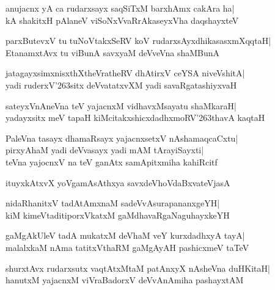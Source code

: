 \documentclass[twoside,12pt,openright]{book}
\def\S{\char'263}
\newcounter{shloka}[chapter]
\begin{document}
\begin{shloka}%
anujacnx yA ca rudarxsayx saqSiTxM barxhAmx cakAra ha|\\
kA shakitxH pAlaneV viSoNxVvaRrAkaseyxVha daqshayxteV
\end{shloka}

\begin{shloka}%
parxButevxV tu tuNoVtakxSeRV koV rudarxsAyxdhikasasxmXqqtaH|\\
EtanamxtAvx tu viBunA savxyaM deVveVna shaMBunA
\end{shloka}

\begin{shloka}%
jatagayxsimxnisxthXtheVratheRV dhAtirxV ceYSA niveVshitA|\\
yadi ruderxV\S sitx deVvatatxvXM yadi savaRgatashiyxvaH
\end{shloka}

\begin{shloka}%
sateyxVnAneVna teV yajacnxM vidhavxMsayatu shaMkaraH|\\
yadayxsitx meV tapaH kiMcitakxshicxdadhxmoRV\S thavA kaqtaH
\end{shloka}

\begin{shloka}%
PaleVna tasayx dhamaRsayx yajacnxsetxV nAshamaqcaCxtu|\\
pirxyAhaM yadi deVvasayx yadi mAM tArayiSayxti|\\
teVna yajocnxV na teV ganAtx samApitxmiha kahiRcitf
\end{shloka}

\begin{shloka}%
ituyxkAtxvX yoVgamAsAthxya savxdeVhoVdaBxvateVjasA
\end{shloka}

\begin{shloka}%
nidaRhanitxV tadAtAmxnaM sadeVvAsurapananxgeYH|\\
kiM kimeVtaditiporxVkatxM gaMdhavaRgaNaguhayxkeYH
\end{shloka}

\begin{shloka}%
gaMgAkUleV tadA mukatxM deVhaM veY kurxdadhxyA tayA|\\
malalxkaM nAma tatitxVthaRM gaMgAyAH pashicxmeV taTeV
\end{shloka}

\begin{shloka}%
shurxtAvx rudarxsutx vaqtAtxMtaM patAnxyX nAsheVna duHKitaH|\\
hanutxM yajacnxM viVraBadorxV deVvAnAmiha pashayxtAM
\end{shloka}
\end{document}
